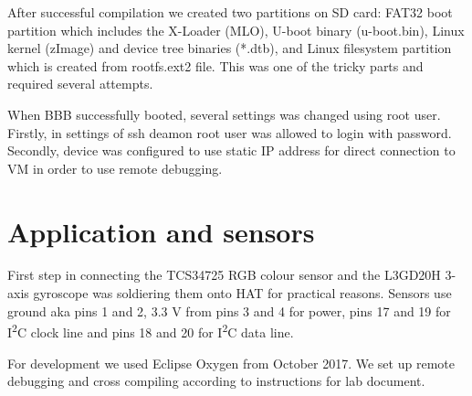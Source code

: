 \documentclass[UKenglish,10pt,a4paper]{report}
\let\openright=\clearpage
\begin{document}
After successful compilation we created two partitions on SD card: FAT32 boot partition which includes the X-Loader (MLO), U-boot binary (u-boot.bin), Linux kernel (zImage) and device tree binaries (*.dtb), and Linux filesystem partition which is created from rootfs.ext2 file. This was one of the tricky parts and required several attempts.

When BBB successfully booted, several settings was changed using root user. Firstly, in settings of ssh deamon root user was allowed to login with password. Secondly, device was configured to use static IP address for direct connection to VM in order to use remote debugging.
\chapter{Application and sensors}
First step in connecting the TCS34725 RGB colour sensor and the  L3GD20H 3-axis gyroscope was soldiering them onto HAT for practical reasons. Sensors use ground aka pins 1 and 2, 3.3 V from pins 3 and 4 for power, pins 17 and 19 for I\textsuperscript{2}C clock line and pins 18 and 20 for I\textsuperscript{2}C data line.

For development we used Eclipse Oxygen from October 2017. We set up remote debugging and cross compiling according to instructions for lab document.

\renewcommand{\acronymname}{List of acronyms}
\printglossaries



% 
\printbibliography
\openright
\end{document}
